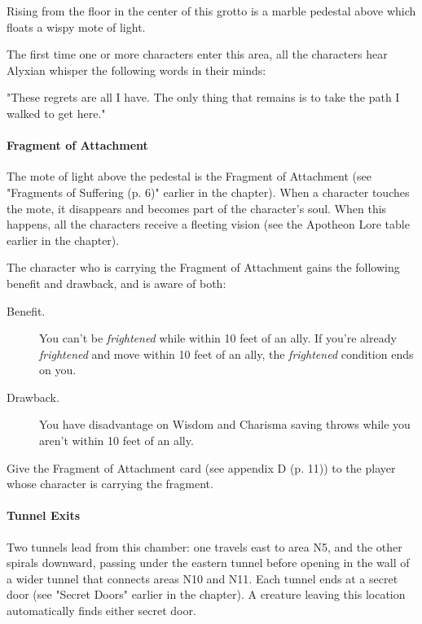 \documentclass[a4paper, 11pt, bg=full, twocolumn, nooutline]{dndbook}
\begin{document}
\begin{DndReadAloud}
Rising from the floor in the center of this grotto is a marble pedestal above which floats a wispy mote of light.
\end{DndReadAloud}

The first time one or more characters enter this area, all the characters hear Alyxian whisper the following words in their minds:

\begin{DndReadAloud}
"These regrets are all I have. The only thing that remains is to take the path I walked to get here."
\end{DndReadAloud}

\paragraph{Fragment of Attachment}

The mote of light above the pedestal is the Fragment of Attachment (see "Fragments of Suffering (p. 6)" earlier in the chapter). When a character touches the mote, it disappears and becomes part of the character's soul. When this happens, all the characters receive a fleeting vision (see the Apotheon Lore table earlier in the chapter).

The character who is carrying the Fragment of Attachment gains the following benefit and drawback, and is aware of both:

\begin{DndSidebar}{}
\begin{description}
\item[Benefit.] You can't be \textit{frightened} while within 10 feet of an ally. If you're already \textit{frightened} and move within 10 feet of an ally, the \textit{frightened} condition ends on you.
\item[Drawback.] You have disadvantage on Wisdom and Charisma saving throws while you aren't within 10 feet of an ally.
\end{description}
\end{DndSidebar}

Give the Fragment of Attachment card (see appendix D (p. 11)) to the player whose character is carrying the fragment.

\paragraph{Tunnel Exits}

Two tunnels lead from this chamber: one travels east to area N5, and the other spirals downward, passing under the eastern tunnel before opening in the wall of a wider tunnel that connects areas N10 and N11. Each tunnel ends at a secret door (see "Secret Doors" earlier in the chapter). A creature leaving this location automatically finds either secret door.
\end{document}
